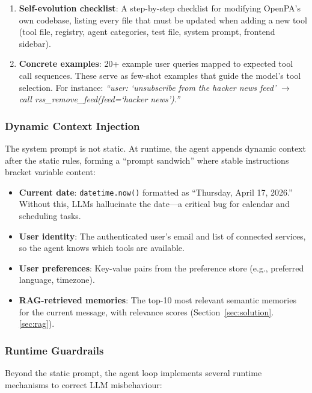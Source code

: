 \begin{enumerate}[leftmargin=*]
  \item \textbf{Self-evolution checklist}: A step-by-step checklist for modifying OpenPA's own codebase, listing every file that must be updated when adding a new tool (tool file, registry, agent categories, test file, system prompt, frontend sidebar).

  \item \textbf{Concrete examples}: 20+ example user queries mapped to expected tool call sequences. These serve as few-shot examples that guide the model's tool selection. For instance: \textit{``user: `unsubscribe from the hacker news feed' $\rightarrow$ call rss\_remove\_feed(feed=`hacker news').''}
\end{enumerate}

\subsubsection{Dynamic Context Injection}

The system prompt is not static. At runtime, the agent appends dynamic context after the static rules, forming a ``prompt sandwich'' where stable instructions bracket variable content:

\begin{itemize}[leftmargin=*]
  \item \textbf{Current date}: \texttt{datetime.now()} formatted as ``Thursday, April 17, 2026.'' Without this, LLMs hallucinate the date---a critical bug for calendar and scheduling tasks.
  \item \textbf{User identity}: The authenticated user's email and list of connected services, so the agent knows which tools are available.
  \item \textbf{User preferences}: Key-value pairs from the preference store (e.g., preferred language, timezone).
  \item \textbf{RAG-retrieved memories}: The top-10 most relevant semantic memories for the current message, with relevance scores (Section~\ref{sec:solution}.\ref{sec:rag}).
\end{itemize}

\subsubsection{Runtime Guardrails}

Beyond the static prompt, the agent loop implements several runtime mechanisms to correct LLM misbehaviour:

